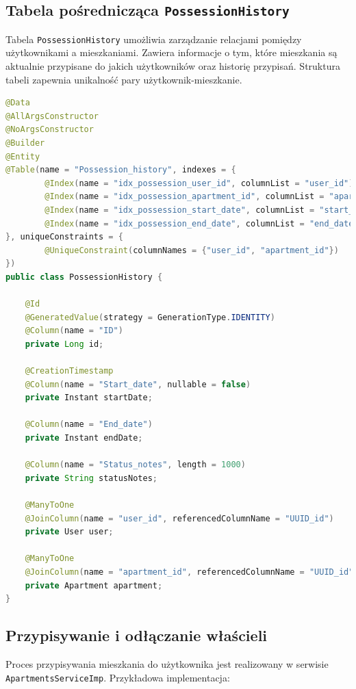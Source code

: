 \subsection{Tabela pośrednicząca \texttt{PossessionHistory}}

Tabela \texttt{PossessionHistory} umożliwia zarządzanie relacjami pomiędzy użytkownikami a mieszkaniami. Zawiera informacje o tym, które mieszkania są aktualnie przypisane do jakich użytkowników oraz historię przypisań. Struktura tabeli zapewnia unikalność pary użytkownik-mieszkanie.

\begin{lstlisting}[language=Java, caption=Tabela pośrednicząca \texttt{PossessionHistory}]
@Data
@AllArgsConstructor
@NoArgsConstructor
@Builder
@Entity
@Table(name = "Possession_history", indexes = {
        @Index(name = "idx_possession_user_id", columnList = "user_id"),
        @Index(name = "idx_possession_apartment_id", columnList = "apartment_id"),
        @Index(name = "idx_possession_start_date", columnList = "start_date"),
        @Index(name = "idx_possession_end_date", columnList = "end_date")
}, uniqueConstraints = {
        @UniqueConstraint(columnNames = {"user_id", "apartment_id"})
})
public class PossessionHistory {

    @Id
    @GeneratedValue(strategy = GenerationType.IDENTITY)
    @Column(name = "ID")
    private Long id;

    @CreationTimestamp
    @Column(name = "Start_date", nullable = false)
    private Instant startDate;

    @Column(name = "End_date")
    private Instant endDate;

    @Column(name = "Status_notes", length = 1000)
    private String statusNotes;

    @ManyToOne
    @JoinColumn(name = "user_id", referencedColumnName = "UUID_id")
    private User user;

    @ManyToOne
    @JoinColumn(name = "apartment_id", referencedColumnName = "UUID_id")
    private Apartment apartment;
}
\end{lstlisting}

\subsection{Przypisywanie i odłączanie właścieli}

Proces przypisywania mieszkania do użytkownika jest realizowany w serwisie \texttt{ApartmentsServiceImp}. Przykładowa implementacja:

